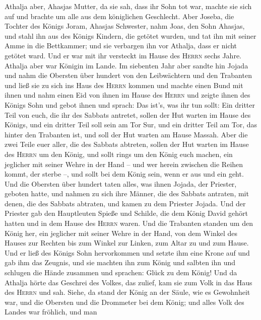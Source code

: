  Athalja aber, Ahasjas Mutter, da sie sah, dass ihr Sohn
tot war, machte sie sich auf und brachte um alle aus dem königlichen
Geschlecht.  Aber Joseba, die Tochter des Königs Joram,
Ahasjas Schwester, nahm Joas, den Sohn Ahasjas, und stahl ihn aus des
Königs Kindern, die getötet wurden, und tat ihn mit seiner Amme in die
Bettkammer; und sie verbargen ihn vor Athalja, dass er nicht getötet
ward.  Und er war mit ihr versteckt im Hause des
\textsc{Herrn} sechs Jahre. Athalja aber war Königin im Lande.
 Im siebenten Jahr aber sandte hin Jojada und nahm die
Obersten über hundert von den Leibwächtern und den Trabanten und ließ
sie zu sich ins Haus des \textsc{Herrn} kommen und machte einen Bund mit
ihnen und nahm einen Eid von ihnen im Hause des \textsc{Herrn} und
zeigte ihnen des Königs Sohn  und gebot ihnen und sprach:
Das ist's, was ihr tun sollt: Ein dritter Teil von euch, die ihr des
Sabbats antretet, sollen der Hut warten im Hause des Königs,
 und ein dritter Teil soll sein am Tor Sur, und ein
dritter Teil am Tor, das hinter den Trabanten ist, und soll der Hut
warten am Hause Massah.  Aber die zwei Teile euer aller,
die des Sabbats abtreten, sollen der Hut warten im Hause des
\textsc{Herrn} um den König,  und sollt rings um den König
euch machen, ein jeglicher mit seiner Wehre in der Hand -- und wer
herein zwischen die Reihen kommt, der sterbe --, und sollt bei dem König
sein, wenn er aus und ein geht.  Und die Obersten über
hundert taten alles, was ihnen Jojada, der Priester, geboten hatte, und
nahmen zu sich ihre Männer, die des Sabbats antraten, mit denen, die des
Sabbats abtraten, und kamen zu dem Priester Jojada.  Und
der Priester gab den Hauptleuten Spieße und Schilde, die dem König David
gehört hatten und in dem Hause des \textsc{Herrn} waren. 
Und die Trabanten standen um den König her, ein jeglicher mit seiner
Wehre in der Hand, von dem Winkel des Hauses zur Rechten bis zum Winkel
zur Linken, zum Altar zu und zum Hause.  Und er ließ des
Königs Sohn hervorkommen und setzte ihm eine Krone auf und gab ihm das
Zeugnis, und sie machten ihn zum König und salbten ihn und schlugen die
Hände zusammen und sprachen: Glück zu dem König!  Und da
Athalja hörte das Geschrei des Volkes, das zulief, kam sie zum Volk in
das Haus des \textsc{Herrn}  und sah. Siehe, da stand der
König an der Säule, wie es Gewohnheit war, und die Obersten und die
Drommeter bei dem König; und alles Volk des Landes war fröhlich, und man
